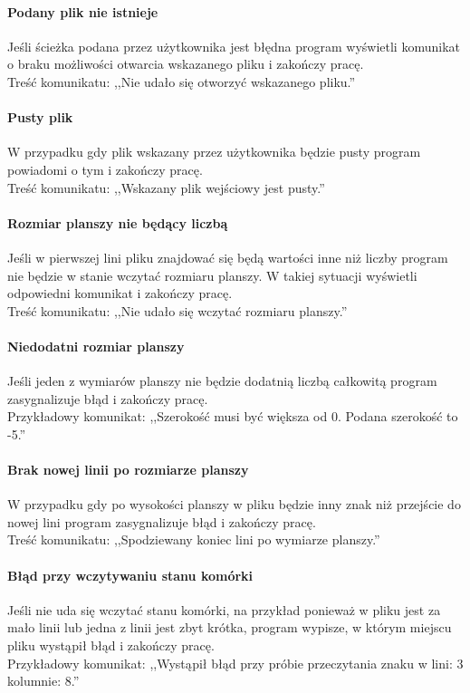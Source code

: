 \documentclass{report}
\begin{document}
\paragraph{Podany plik nie istnieje}
Jeśli ścieżka podana przez użytkownika jest błędna program wyświetli komunikat o braku możliwości otwarcia wskazanego pliku i zakończy pracę. \\
Treść komunikatu: ,,Nie udało się otworzyć wskazanego pliku.''

\paragraph{Pusty plik}
W przypadku gdy plik wskazany przez użytkownika będzie pusty program powiadomi o tym i zakończy pracę. \\
Treść komunikatu: ,,Wskazany plik wejściowy jest pusty.''

\paragraph{Rozmiar planszy nie będący liczbą}
Jeśli w pierwszej lini pliku znajdować się będą wartości inne niż liczby program nie będzie w stanie wczytać rozmiaru planszy. W takiej sytuacji wyświetli odpowiedni komunikat i zakończy pracę. \\
 Treść komunikatu: ,,Nie udało się wczytać rozmiaru planszy.''
 
 \paragraph{Niedodatni rozmiar planszy}
 Jeśli jeden z wymiarów planszy nie będzie dodatnią liczbą całkowitą program zasygnalizuje błąd i zakończy pracę. \\
 Przykładowy komunikat: ,,Szerokość musi być większa od 0. Podana szerokość to -5.''
 
 \paragraph{Brak nowej linii po rozmiarze planszy}
 W przypadku gdy po wysokości planszy w pliku będzie inny znak niż przejście do nowej lini program zasygnalizuje błąd i zakończy pracę. \\
 Treść komunikatu: ,,Spodziewany koniec lini po wymiarze planszy.''
 
 \paragraph{Błąd przy wczytywaniu stanu komórki}
 Jeśli nie uda się wczytać stanu komórki, na przykład ponieważ w pliku jest za mało linii lub jedna z linii jest zbyt krótka, program wypisze, w którym miejscu pliku wystąpił błąd i zakończy pracę. \\
 Przykładowy komunikat: ,,Wystąpił błąd przy próbie przeczytania znaku w lini: 3 kolumnie: 8.''
 
\end{document}
